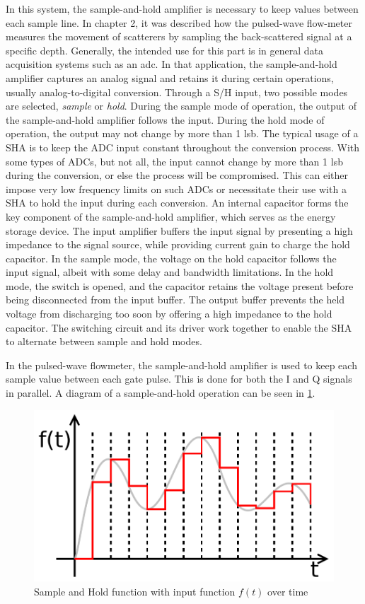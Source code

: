 In this system, the sample-and-hold amplifier is necessary to keep values between each sample line. In chapter 2, it was described how the pulsed-wave flow-meter measures the movement of scatterers by sampling the back-scattered signal at a specific depth. Generally, the intended use for this part is in general data acquisition systems such as an \gls{adc}. In that application, the sample-and-hold amplifier captures an analog signal and retains it during certain operations, usually analog-to-digital conversion. Through a S/H input, two possible modes are selected, \textit{sample} or \textit{hold}. During the sample mode of operation, the output of the sample-and-hold amplifier follows the input. During the hold mode of operation, the output may not change by more than 1 \gls{lsb}. The typical usage of a SHA is to keep the ADC input constant throughout the conversion process. With some types of ADCs, but not all, the input cannot change by more than 1 \gls{lsb} during the conversion, or else the process will be compromised. This can either impose very low frequency limits on such ADCs or necessitate their use with a SHA to hold the input during each conversion. An internal capacitor forms the key component of the sample-and-hold amplifier, which serves as the energy storage device. The input amplifier buffers the input signal by presenting a high impedance to the signal source, while providing current gain to charge the hold capacitor. In the sample mode, the voltage on the hold capacitor follows the input signal, albeit with some delay and bandwidth limitations. In the hold mode, the switch is opened, and the capacitor retains the voltage present before being disconnected from the input buffer. The output buffer prevents the held voltage from discharging too soon by offering a high impedance to the hold capacitor. The switching circuit and its driver work together to enable the SHA to alternate between sample and hold modes.

In the pulsed-wave flowmeter, the sample-and-hold amplifier is used to keep each sample value between each gate pulse. This is done for both the I and Q signals in parallel. A diagram of a sample-and-hold operation can be seen in \cref{fig:3_sha_function}.

\begin{figure}[htbp]
	\centering
	\includegraphics[width=.8\textwidth]{Figures/3_sample_hold_amplifier_quantization.pdf}
	\caption{Sample and Hold function with input function $f(t)$ over time \cite{sha_pic}}
	\label{fig:3_sha_function}
\end{figure}
